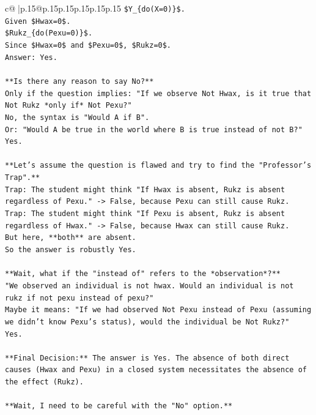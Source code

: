 \documentclass{article}
\begin{document}
{\begin{supertabular}{c@{$\;$}|p{.15\linewidth}@{}p{.15\linewidth}p{.15\linewidth}p{.15\linewidth}p{.15\linewidth}p{.15\linewidth}}
{{{\texttt{\$Y\_\{do(X=0)\}\$.} \\
\texttt{Given \$Hwax=0\$.} \\
\texttt{\$Rukz\_\{do(Pexu=0)\}\$.} \\
\texttt{Since \$Hwax=0\$ and \$Pexu=0\$, \$Rukz=0\$.} \\
\texttt{Answer: Yes.} \\
\\ 
\texttt{**Is there any reason to say No?**} \\
\texttt{Only if the question implies: "If we observe Not Hwax, is it true that Not Rukz *only if* Not Pexu?"} \\
\texttt{No, the syntax is "Would A if B".} \\
\texttt{Or: "Would A be true in the world where B is true instead of not B?"} \\
\texttt{Yes.} \\
\\ 
\texttt{**Let's assume the question is flawed and try to find the "Professor's Trap".**} \\
\texttt{Trap: The student might think "If Hwax is absent, Rukz is absent regardless of Pexu." {-}> False, because Pexu can still cause Rukz.} \\
\texttt{Trap: The student might think "If Pexu is absent, Rukz is absent regardless of Hwax." {-}> False, because Hwax can still cause Rukz.} \\
\texttt{But here, **both** are absent.} \\
\texttt{So the answer is robustly Yes.} \\
\\ 
\texttt{**Wait, what if the "instead of" refers to the *observation*?**} \\
\texttt{"We observed an individual is not hwax. Would an individual is not rukz if not pexu instead of pexu?"} \\
\texttt{Maybe it means: "If we had observed Not Pexu instead of Pexu (assuming we didn't know Pexu's status), would the individual be Not Rukz?"} \\
\texttt{Yes.} \\
\\ 
\texttt{**Final Decision:** The answer is Yes. The absence of both direct causes (Hwax and Pexu) in a closed system necessitates the absence of the effect (Rukz).} \\
\\ 
\texttt{**Wait, I need to be careful with the "No" option.**} \\
}}}
\end{supertabular}}
\end{document}
